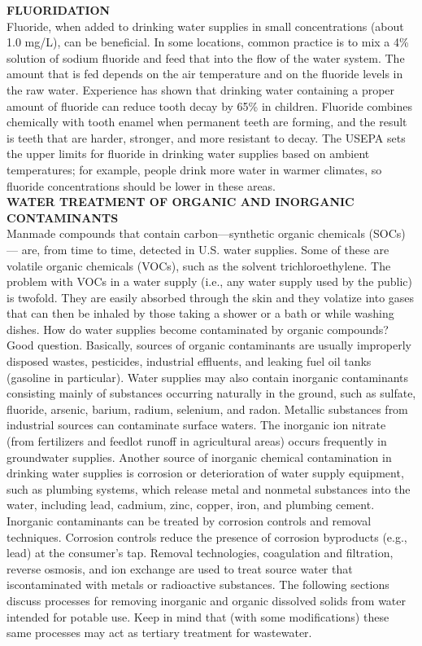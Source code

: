 \documentclass{article}
\begin{document}
\textbf{FLUORIDATION}\\
Fluoride, when added to drinking water supplies in small concentrations (about 1.0 mg/L), can be beneficial. In some locations, common practice is to mix a 4\% solution of sodium fluoride and feed that into the flow of the water system. The amount that is fed depends on the air temperature and on the fluoride levels in the raw water. Experience has shown that drinking water containing a proper amount of fluoride can reduce tooth decay by 65\% in children. Fluoride combines chemically with tooth enamel when permanent teeth are forming, and the result is teeth that are harder, stronger, and more resistant to decay. The USEPA sets the upper limits for fluoride in drinking water supplies based on ambient temperatures; for example, people drink more water in warmer climates, so fluoride concentrations should be lower in these areas.\\

\textbf{WATER TREATMENT OF ORGANIC AND INORGANIC CONTAMINANTS}\\
Manmade compounds that contain carbon—synthetic organic chemicals (SOCs)— are, from time to time, detected in U.S. water supplies. Some of these are volatile organic chemicals (VOCs), such as the solvent trichloroethylene. The problem with VOCs in a water supply (i.e., any water supply used by the public) is twofold. They are easily absorbed through the skin and they volatize into gases that can then be inhaled by those taking a shower or a bath or while washing dishes. How do water supplies become contaminated by organic compounds? Good question. Basically, sources of organic contaminants are usually improperly disposed wastes, pesticides, industrial effluents, and leaking fuel oil tanks (gasoline in particular).
Water supplies may also contain inorganic contaminants consisting mainly of substances occurring naturally in the ground, such as sulfate, fluoride, arsenic, barium, radium, selenium, and radon. Metallic substances from industrial sources can contaminate surface waters. The inorganic ion nitrate (from fertilizers and feedlot runoff in agricultural areas) occurs frequently in groundwater supplies. Another source of inorganic chemical contamination in drinking water supplies is corrosion or deterioration of water supply equipment, such as plumbing systems, which release metal and nonmetal substances into the water, including lead, cadmium, zinc, copper, iron, and plumbing cement. Inorganic contaminants can be treated by corrosion controls and removal techniques. Corrosion controls reduce the presence of corrosion byproducts (e.g., lead) at the consumer’s tap. Removal technologies, coagulation and filtration, reverse osmosis, and ion exchange are used to treat source water that iscontaminated with metals or radioactive substances. The following sections discuss processes for removing inorganic and organic dissolved solids from water intended for potable use. Keep in mind that (with some modifications) these same processes may act as tertiary treatment for wastewater.\\
 
\end{document}
